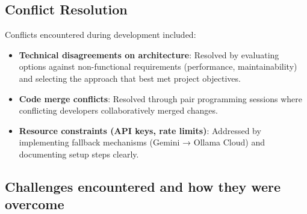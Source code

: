 \documentclass[12pt,a4paper]{report}
\begin{document}
\subsection{Conflict Resolution}
Conflicts encountered during development included:

\begin{itemize}
    \item \textbf{Technical disagreements on architecture}: Resolved by evaluating options against non-functional requirements (performance, maintainability) and selecting the approach that best met project objectives.
    \item \textbf{Code merge conflicts}: Resolved through pair programming sessions where conflicting developers collaboratively merged changes.
    \item \textbf{Resource constraints (API keys, rate limits)}: Addressed by implementing fallback mechanisms (Gemini → Ollama Cloud) and documenting setup steps clearly.
\end{itemize}

\subsection{Challenges encountered and how they were overcome}
\end{document}
